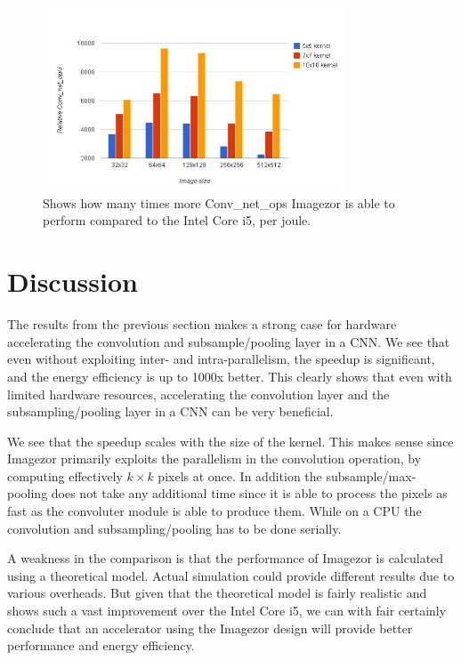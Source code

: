 \begin{figure}
  \centering
      \includegraphics[width=0.8\textwidth]{Figures/Results/energy_efficiency}
  \caption[Speedup]{Shows how many times more Conv\_net\_ops Imagezor is able to perform compared to the Intel Core i5, per joule.}
  \label{fig_cpu_energy_cmp_results}
\end{figure}

\section{Discussion}

The results from the previous section makes a strong case for hardware accelerating the convolution and subsample/pooling layer in a CNN. We see that even without exploiting inter- and intra-parallelism, the speedup is significant, and the energy efficiency is up to 1000x better. This clearly shows that even with limited hardware resources, accelerating the convolution layer and the subsampling/pooling layer in a CNN can be very beneficial. 

We see that the speedup scales with the size of the kernel. This makes sense since Imagezor primarily exploits the parallelism in the convolution operation, by computing effectively $ k \times k $ pixels at once. In addition the subsample/max-pooling does not take any additional time since it is able to process the pixels as fast as the convoluter module is able to produce them. While on a CPU the convolution and subsampling/pooling has to be done serially.  

A weakness in the comparison is that the performance of Imagezor is calculated using a theoretical model. Actual simulation could provide different results due to various overheads. But given that the theoretical model is fairly realistic and shows such a vast improvement over the Intel Core i5, we can with fair certainly conclude that an accelerator using the Imagezor design will provide better performance and energy efficiency. 

